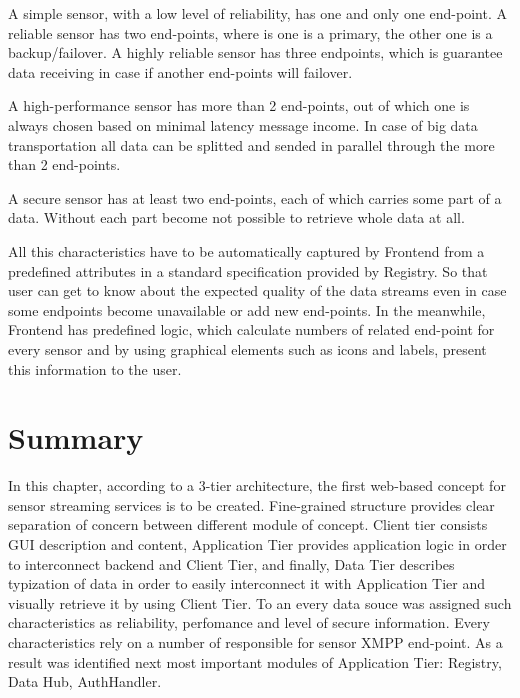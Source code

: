   A simple sensor, with a low level of reliability, has one and only one end-point. A reliable sensor has two end-points, where is one is a primary, the other one is a backup/failover. A highly reliable sensor has three endpoints, which is guarantee data receiving in case if another end-points will failover. 

  A high-performance sensor has more than 2 end-points, out of which one is always chosen based on minimal latency message income. In case of big data transportation all data can be splitted and sended in parallel through the more than 2 end-points. 

  A secure sensor has at least two end-points, each of which carries some part of a data. Without each part become not possible to retrieve whole data at all. 

 All this characteristics have to be automatically captured by Frontend from a predefined attributes in a standard specification provided by Registry. So that user can get to know about the expected quality of the data streams even in case some endpoints become unavailable or add new end-points. In the meanwhile, Frontend has predefined logic, which calculate numbers of related end-point for every sensor and by using graphical elements such as icons and labels, present this information to the user.

\section{Summary}
	In this chapter, according to a 3-tier architecture, the first web-based concept for sensor streaming services is to be created. Fine-grained structure provides clear separation of concern between different module of concept. Client tier consists GUI description and content, Application Tier provides application logic in order to interconnect backend and Client Tier, and finally, Data Tier describes typization of data in order to easily interconnect it with Application Tier and visually retrieve it by using Client Tier. To an every data souce was assigned such characteristics as reliability, perfomance and level of secure information. Every characteristics rely on a number of responsible for sensor XMPP end-point. As a result was identified next most important modules of Application Tier: Registry, Data Hub, AuthHandler. 

